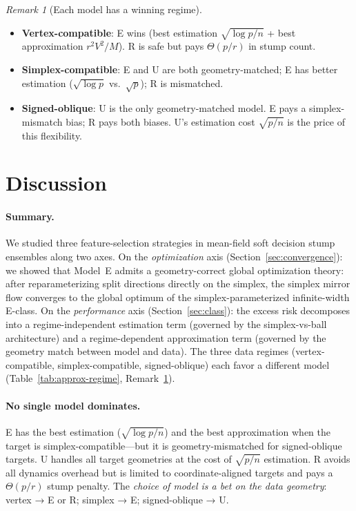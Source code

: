 \documentclass[11pt,a4paper]{article}
\theoremstyle{definition}
\theoremstyle{remark}
\newtheorem{remark}[theorem]{Remark}
\begin{document}
\begin{remark}[Each model has a winning regime]
  \label{rem:winning}
  \begin{itemize}[nosep]
    \item \textbf{Vertex-compatible}:
    E wins (best estimation $\sqrt{\log p/n}$
    + best approximation $r^2V^2/M$).
    R is safe but pays $\Theta(p/r)$
    in stump count.
    \item \textbf{Simplex-compatible}:
    E and U are both geometry-matched;
    E has better estimation
    ($\sqrt{\log p}$ vs.\ $\sqrt{p}$);
    R is mismatched.
    \item \textbf{Signed-oblique}:
    U is the only geometry-matched model.
    E pays a simplex-mismatch bias;
    R pays both biases.
    U's estimation cost $\sqrt{p/n}$ is
    the price of this flexibility.
  \end{itemize}
\end{remark}


\section{Discussion}
\label{sec:discussion}

\paragraph{Summary.}
We studied three feature-selection strategies
in mean-field soft decision stump ensembles
along two axes.
On the \emph{optimization} axis
(Section~\ref{sec:convergence}):
we showed that Model~E admits a
geometry-correct global optimization theory:
after reparameterizing split directions
directly on the simplex,
the simplex mirror flow converges to the
global optimum of the simplex-parameterized
infinite-width E-class.
On the \emph{performance} axis
(Section~\ref{sec:class}):
the excess risk decomposes into
a regime-independent estimation term
(governed by the simplex-vs-ball
architecture) and a regime-dependent
approximation term (governed by the
geometry match between model and data).
The three data regimes
(vertex-compatible, simplex-compatible,
signed-oblique) each favor a different model
(Table~\ref{tab:approx-regime},
Remark~\ref{rem:winning}).

\paragraph{No single model dominates.}
E has the best estimation
($\sqrt{\log p/n}$) and the best
approximation when the target is
simplex-compatible---but it is
geometry-mismatched for signed-oblique
targets.
U handles all target geometries at the cost
of $\sqrt{p/n}$ estimation.
R avoids all dynamics overhead but is
limited to coordinate-aligned targets and
pays a $\Theta(p/r)$ stump penalty.
The \emph{choice of model is a bet on the
data geometry}: vertex → E or R;
simplex → E; signed-oblique → U.
\end{document}
